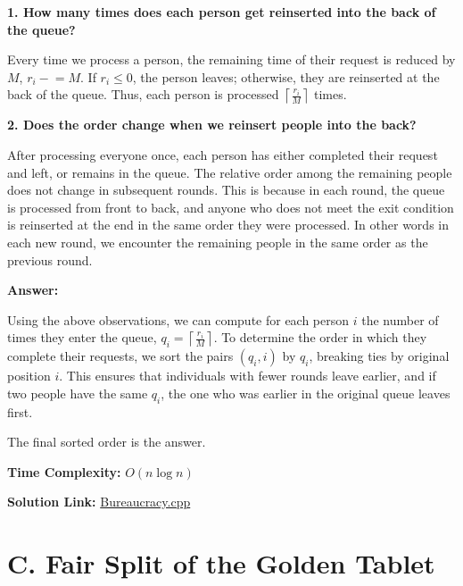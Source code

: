 \documentclass{article}
\begin{document}
\noindent  \textbf{1. How many times does each person get reinserted into the back of the queue?}

\noindent Every time we process a person, the remaining time of their request is reduced by \( M \), \( r_i \mathrel{-}= M \).  
If \( r_i \leq 0 \), the person leaves; otherwise, they are reinserted at the back of the queue.  
Thus, each person is processed \( \left\lceil \frac{r_i}{M} \right\rceil \) times.

\vspace{1em}

\noindent \textbf{2. Does the order change when we reinsert people into the back?}

\noindent After processing everyone once, each person has either completed their request and left, or remains in the queue.  
The relative order among the remaining people does not change in subsequent rounds. This is because in each round, the queue is processed from front to back, and anyone who does not meet the exit condition is reinserted at the end in the same order they were processed.  
In other words in each new round, we encounter the remaining people in the same order as the previous round.

\vspace{2em}

\noindent \textbf{Answer:}

\noindent Using the above observations, we can compute for each person \( i \) the number of times they enter the queue, \( q_i = \left\lceil \frac{r_i}{M} \right\rceil \).  
To determine the order in which they complete their requests, we sort the pairs \( (q_i, i) \) by \( q_i \), breaking ties by original position \( i \).  
This ensures that individuals with fewer rounds leave earlier, and if two people have the same \( q_i \), the one who was earlier in the original queue leaves first.

\noindent The final sorted order is the answer.

\vspace{1em}
\noindent \textbf{Time Complexity:}
$O(n\log n)$

\vspace{1em}
\noindent \textbf{Solution Link:} 
\href{https://github.com/StathisKons/GRCPC-2024-Editorial-Implementations/blob/main/B.%20Bureaucracy.cpp}{Bureaucracy.cpp}

\newpage
\vspace{5em}
\section*{C. Fair Split of the Golden Tablet}
\end{document}
